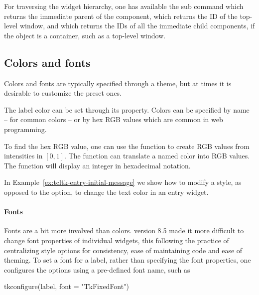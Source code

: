 For traversing the widget hierarchy, one has available the
 sub command which returns the immediate
parent of the component,  which returns
the ID of the top-level window, and 
which returns the IDs of all the immediate child components, if the
object is a container, such as a top-level window.


\subsection{Colors and fonts}
\label{sec:tcltk:overview:colors-fonts}
Colors and fonts are typically specified through a theme, but at times
it is desirable to customize the preset ones.

The label color can be set through its 
property. Colors can be specified by name -- for common colors -- or
by hex RGB values which are common in web programming.
\begin{Schunk}
\end{Schunk}

To find the hex RGB value, one can use the  function to
create RGB values from intensities in $[0,1]$.  The \R\/ function
 can translate a named color into RGB values. The
 function will display an integer in hexadecimal
notation.

In Example~\ref{ex:tcltk-entry-initial-message} we show how to modify
a style, as opposed to the  option, to change the
text color in an entry widget.

\paragraph{Fonts}
Fonts are a bit more involved than colors. \TK\/ version 8.5 made it
more difficult to change font properties of individual widgets, this
following the practice of centralizing style options for consistency,
ease of maintaining code and ease of theming.  To set a font for a
label, rather than specifying the font properties, one configures the
 options using a pre-defined font name, such as
\begin{Schunk}
\begin{Sinput}
 tkconfigure(label, font = "TkFixedFont")
\end{Sinput}
\end{Schunk}

